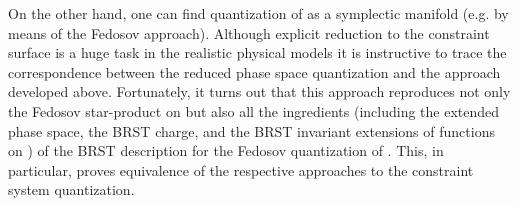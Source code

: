 \documentclass[a4paper,11pt]{amsart}
\numberwithin{thm}{section} %
\numberwithin{equation}{section} %
\numberwithin{figure}{section} %
\renewcommand{\:}{{\rm\, :\,}}
\begin{document}
On the other hand, one can find quantization of \myHighlight{$\Sigma$}\coordHE{} as a
symplectic manifold (e.g. by means of the Fedosov approach).  Although
explicit reduction to the constraint surface \myHighlight{$\Sigma$}\coordHE{} is a huge task
in the realistic physical models it is instructive to trace
the correspondence between the reduced phase space quantization and the
approach developed above.  Fortunately, it turns out that this approach
reproduces not only the Fedosov star-product on \myHighlight{$\Sigma$}\coordHE{} but also
all the ingredients (including the extended phase space, the BRST charge,
and the BRST invariant extensions of functions on \myHighlight{$\Sigma$}\coordHE{})
of the BRST description for the Fedosov
quantization of \myHighlight{$\Sigma$}\coordHE{}.  This, in particular, proves equivalence of
the respective approaches to the constraint system quantization.
\end{document}
